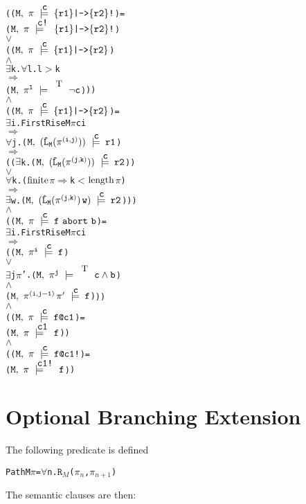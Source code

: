 \documentclass{llncs}
\makeatletter
\newcommand{\And}{\(\wedge\)}
\newcommand{\Or}{\(\vee\)}
\newcommand{\Imp}{\(\Rightarrow\)}
\newcommand{\Forall}{\(\forall\)}
\newcommand{\Exists}{\(\exists\)}
\newcommand{\IsFinitePath}{\({\rm{finite}}\)}
\newcommand{\PathLength}{\({\rm{length}}\)}
\newcommand{\cat}{\hspace*{0.5mm}}
\newcommand{\pathCat}[2]{#1\hspace*{0.5mm}#2}
\newcommand{\Le}{\(<\)}
\newcommand{\Ge}{\(>\)}
\newcommand{\T}{\texttt{\small\rm{T}}}
\renewcommand{\Pi}{\(\pi\)}
\newcommand{\SSem}[4]{(\(\tt{#1,~#2~\models^{\hspace*{-2.3mm}\raisebox{1mm}{\tt#3}}~#4}\))}
\newcommand{\FSem}[4]{(\(\tt{#1,~#2~\models^{\hspace*{-2.3mm}\raisebox{1mm}{\tt#3}}~#4}\))}
\newcommand{\FBool}[1]{#1}
\newcommand{\bNot}[1]{\neg#1}
\newcommand{\weakClock}[1]{#1}
\newcommand{\strongClock}[1]{#1!}
\newcommand{\restN}[2]{#1^{#2}}
\newcommand{\PathEl}[2]{\(#1_{#2}\)}
\newcommand{\pathSeg}[2]{#1^{#2}}
\newcommand{\lHat}[1]{\hat{\texttt{L}}_{#1}}
\newcommand{\getR}[1]{\({\texttt{R}}_{#1}\)}
\newcommand{\bAnd}[2]{#1\wedge#2}
\newcommand{\fStrongImp}[2]{\{#1\}\texttt{|->}\{#2\}\texttt{!}}
\newcommand{\fWeakImp}[2]{\{#1\}\texttt{|->}\{#2\}}
\newcommand{\fAbort}[2]{#1~\texttt{abort}~#2}
\newcommand{\fWeakClock}[2]{#1\texttt{@}#2}
\newcommand{\fStrongClock}[2]{#1\texttt{@}#2\texttt{!}}
\makeatother
\begin{document}
\begin{alltt}
    ({\FSem{M}{{\pi}}{{\weakClock{c}}}{\fStrongImp{r1}{r2}}} = 
      {\FSem{M}{{\pi}}{{\strongClock{c}}}{\fStrongImp{r1}{r2}}}  
      {\Or}
      ({\FSem{M}{{\pi}}{{\weakClock{c}}}{\fWeakImp{r1}{r2}}} 
       {\And}
       {\Exists}k. {\Forall}l. l {\Ge} k 
               {\Imp} 
               {\FSem{M}{\restN{{\pi}}{l}}{\weakClock{\T}}{{\FBool{\bNot{c}}}}}))
    {\And}
    ({\FSem{M}{{\pi}}{{\weakClock{c}}}{\fWeakImp{r1}{r2}}} = 
      {\Exists}i.  FirstRise M {\Pi} c i
           {\Imp}
           {\Forall}j. \SSem{M}{(\lHat{M} (\pathSeg{\pi}{(i,j)}))}{c}{r1}
               {\Imp}
               (({\Exists}k. \SSem{M}{ (\lHat{M} (\pathSeg{\pi}{(j,k)}))}{c}{r2})
                {\Or}
                {\Forall}k. ({\IsFinitePath} {\Pi} {\Imp} k {\Le} \PathLength {\Pi})
                    {\Imp}
                    {\Exists}w. \SSem{M}{(\lHat{M} (\pathSeg{\pi}{(j,k)}){\cat}w)}{c}{r2}))
    {\And}
    ({\FSem{M}{{\pi}}{{\weakClock{c}}}{\fAbort{f}{b}}} =
      {\Exists}i. FirstRise M {\Pi} c i 
          {\Imp}
          ({\FSem{M}{\restN{{\pi}}{i}}{{\weakClock{c}}}{f}} 
           {\Or}   
           {\Exists}j {\Pi}'. {\FSem{M}{\restN{{\pi}}{j}}{\weakClock{\T}}{{\FBool{\bAnd{c}{b}}}}}
                   {\And}
                  {\FSem{M}{\pathCat{\pathSeg{\pi}{(i,j-1)}}{{\pi}'}}{{\weakClock{c}}}{f}}))
    {\And}
    ({\FSem{M}{{\pi}}{{\weakClock{c}}}{\fWeakClock{f}{c1}}} =   
      {\FSem{M}{{\pi}}{{\weakClock{c1}}}{f}})
    {\And}
    ({\FSem{M}{{\pi}}{{\weakClock{c}}}{\fStrongClock{f}{c1}}} =   
      {\FSem{M}{{\pi}}{{\strongClock{c1}}}{f}})
\end{alltt}

\section{Optional Branching Extension}

The following predicate is defined

\begin{alltt}
   Path M {\Pi} = {\Forall}n. \getR{M}(\PathEl{{\pi}}{n}, \PathEl{{\pi}}{n+1})
\end{alltt}

The semantic clauses are then:
\end{document}

